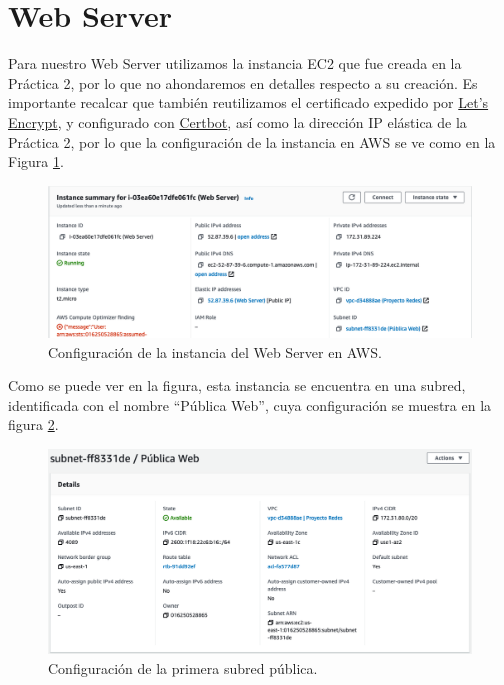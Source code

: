 \documentclass{article}
\begin{document}
\section{Web Server}

Para nuestro Web Server utilizamos la instancia EC2 que
fue creada en la Pr\'actica 2, por lo que no ahondaremos
en detalles respecto a su creaci\'on.   Es importante
recalcar que tambi\'en reutilizamos el certificado
expedido por \href{https://letsencrypt.org/}{Let's Encrypt},
y configurado con \href{https://certbot.eff.org/}{Certbot},
as\'i como la direcci\'on IP el\'astica de la Pr\'actica 2,
por lo que la configuraci\'on de la instancia en AWS se ve
como en la Figura \ref{fig:web-instancia}.

\begin{figure}[H]
  \centering
  \includegraphics[width=\textwidth]{web/instancia}
  \caption{Configuraci\'on de la instancia del Web Server
           en AWS.}
  \label{fig:web-instancia}
\end{figure}

Como se puede ver en la figura, esta instancia se
encuentra en una subred, identificada con el nombre
``P\'ublica Web'', cuya configuraci\'on se muestra
en la figura \ref{fig:web-subred}.

\begin{figure}[H]
  \centering
  \includegraphics[width=\textwidth]{web/subred}
  \caption{Configuraci\'on de la primera subred p\'ublica.}
  \label{fig:web-subred}
\end{figure}
\end{document}
